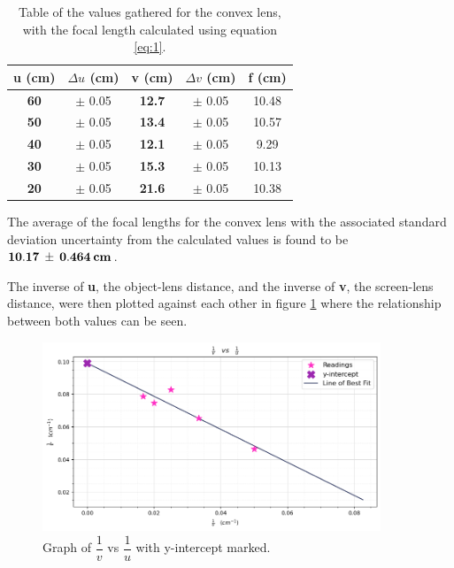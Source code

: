 \documentclass[12pt]{article}
\begin{document}
\begin{table}[H]
    \centering

    \begin{tabular}{|c|c|c|c|c|}
    \hline
    \textbf{u (cm)} & $\Delta u$ (cm) & \textbf{v (cm)} & $\Delta v$ (cm) & f (cm) \\ \hline
    \textbf{60}     & $\pm$ 0.05      & \textbf{12.7}   & $\pm$ 0.05      & 10.48  \\ \hline
    \textbf{50}     & $\pm$ 0.05      & \textbf{13.4}   & $\pm$ 0.05      & 10.57  \\ \hline
    \textbf{40}     & $\pm$ 0.05      & \textbf{12.1}   & $\pm$ 0.05      & 9.29   \\ \hline
    \textbf{30}     & $\pm$ 0.05      & \textbf{15.3}   & $\pm$ 0.05      & 10.13  \\ \hline
    \textbf{20}     & $\pm$ 0.05      & \textbf{21.6}   & $\pm$ 0.05      & 10.38  \\ \hline
    \end{tabular}

    \caption{\centering Table of the values gathered for the convex lens, with the focal length calculated using equation \ref{eq:1}.}
    \label{tab:3}
\end{table}

The average of the focal lengths for the convex lens with the associated standard deviation uncertainty from the calculated values is found to be $\mathbf{10.17 \: \pm \: 0.464 \: \text{\textbf{cm}}}$.

The inverse of \textbf{u}, the object-lens distance, and the inverse of \textbf{v}, the screen-lens distance, were then plotted against each other in figure \ref{fig:convexgraph}
where the relationship between both values can be seen.

\begin{figure}[H]
    \centering
    \includegraphics[width=0.9\textwidth]{convex graph.png}
    \caption{\centering Graph of $\dfrac{1}{v}$ vs $\dfrac{1}{u}$ with y-intercept marked.}
    \label{fig:convexgraph}
\end{figure}
\end{document}

